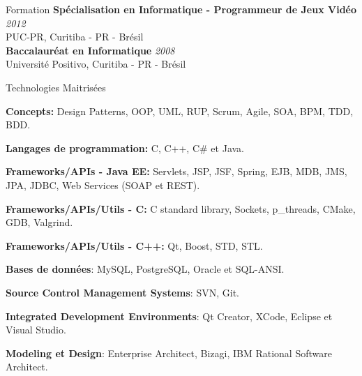 \documentclass{resume}
\begin{document}
  \begin{rSection}{Formation}
    {\bf Spécialisation en Informatique - Programmeur de Jeux Vidéo } \hfill {\em 2012} \\
    {PUC-PR, Curitiba - PR - Brésil} \\ 

    {\bf Baccalauréat en Informatique } \hfill {\em 2008} \\
    {Université Positivo, Curitiba - PR - Brésil}   
  \end{rSection}
  
  \begin{rSection}{Technologies Maitrisées}
    \begin{rSubsection}{}{}{}{}
      \item {\bf Concepts:} Design Patterns, OOP, UML, RUP, Scrum, Agile, SOA, BPM, TDD, BDD.
      \item {\bf Langages de programmation:} C, C++, C\# et Java.
      \item {\bf Frameworks/APIs - Java EE:} Servlets, JSP, JSF, Spring, EJB, MDB, JMS, JPA, JDBC, Web Services (SOAP et REST).
      \item {\bf Frameworks/APIs/Utils - C:} C standard library, Sockets, p\_threads, CMake, GDB, Valgrind.
      \item {\bf Frameworks/APIs/Utils - C++:} Qt, Boost, STD, STL.
      \item {\bf Bases de données}: MySQL, PostgreSQL, Oracle et SQL-ANSI.
      \item {\bf Source Control Management Systems}: SVN, Git.
      \item {\bf Integrated Development Environments}: Qt Creator, XCode, Eclipse et Visual Studio.
      \item {\bf Modeling et Design}: Enterprise Architect, Bizagi, IBM Rational Software Architect.
    \end{rSubsection}
  \end{rSection}
\end{document}
